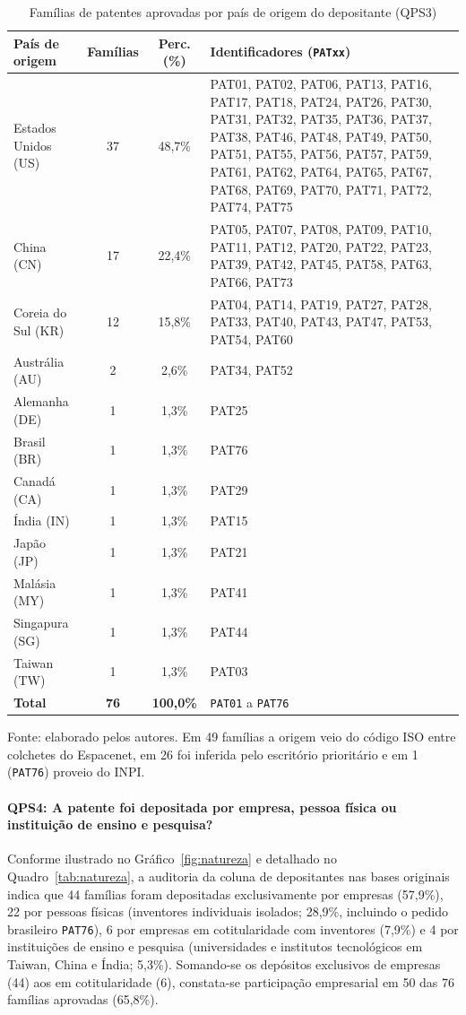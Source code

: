 \documentclass[12pt,a4paper]{article}
\begin{document}
\begin{table}[htbp]
\centering\small
\caption{Famílias de patentes aprovadas por país de origem do depositante (QPS3)}\label{tab:pais_orig}
\begin{tabular}{p{3.4cm}ccp{6.8cm}}
\toprule
\textbf{País de origem} & \textbf{Famílias} & \textbf{Perc. (\%)} & \textbf{Identificadores (\texttt{PATxx})}\\
\midrule
Estados Unidos (US) & 37 & 48,7\% & PAT01, PAT02, PAT06, PAT13, PAT16, PAT17, PAT18, PAT24, PAT26, PAT30, PAT31, PAT32, PAT35, PAT36, PAT37, PAT38, PAT46, PAT48, PAT49, PAT50, PAT51, PAT55, PAT56, PAT57, PAT59, PAT61, PAT62, PAT64, PAT65, PAT67, PAT68, PAT69, PAT70, PAT71, PAT72, PAT74, PAT75\\
China (CN) & 17 & 22,4\% & PAT05, PAT07, PAT08, PAT09, PAT10, PAT11, PAT12, PAT20, PAT22, PAT23, PAT39, PAT42, PAT45, PAT58, PAT63, PAT66, PAT73\\
Coreia do Sul (KR) & 12 & 15,8\% & PAT04, PAT14, PAT19, PAT27, PAT28, PAT33, PAT40, PAT43, PAT47, PAT53, PAT54, PAT60\\
Austrália (AU) & 2 & 2,6\% & PAT34, PAT52\\
Alemanha (DE) & 1 & 1,3\% & PAT25\\
Brasil (BR) & 1 & 1,3\% & PAT76\\
Canadá (CA) & 1 & 1,3\% & PAT29\\
Índia (IN) & 1 & 1,3\% & PAT15\\
Japão (JP) & 1 & 1,3\% & PAT21\\
Malásia (MY) & 1 & 1,3\% & PAT41\\
Singapura (SG) & 1 & 1,3\% & PAT44\\
Taiwan (TW) & 1 & 1,3\% & PAT03\\
\midrule
\textbf{Total} & \textbf{76} & \textbf{100,0\%} & \texttt{PAT01} a \texttt{PAT76}\\
\bottomrule
\end{tabular}

\smallskip
\footnotesize Fonte: elaborado pelos autores. Em 49 famílias a origem veio do código ISO entre colchetes do Espacenet, em 26 foi inferida pelo escritório prioritário e em 1 (\texttt{PAT76}) proveio do INPI.
\end{table}

\paragraph{QPS4: A patente foi depositada por empresa, pessoa física ou instituição de ensino e pesquisa?}
Conforme ilustrado no Gráfico~\ref{fig:natureza} e detalhado no Quadro~\ref{tab:natureza}, a auditoria da coluna de depositantes nas bases originais indica que 44 famílias foram depositadas exclusivamente por empresas (57,9\%), 22 por pessoas físicas (inventores individuais isolados; 28,9\%, incluindo o pedido brasileiro \texttt{PAT76}), 6 por empresas em cotitularidade com inventores (7,9\%) e 4 por instituições de ensino e pesquisa (universidades e institutos tecnológicos em Taiwan, China e Índia; 5,3\%). Somando-se os depósitos exclusivos de empresas (44) aos em cotitularidade (6), constata-se participação empresarial em 50 das 76 famílias aprovadas (65,8\%).
\end{document}
